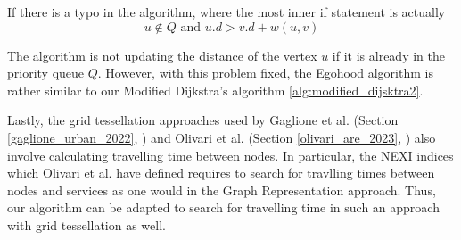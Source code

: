 If there is a typo in the algorithm, where the most inner if statement is actually $$u\notin Q \text{ and }u.d>v.d+w(u,v)$$

The algorithm is not updating the distance of the vertex $u$ if it is already in the priority queue $Q$. However, with this problem fixed, the Egohood algorithm is rather similar to our Modified Dijkstra's algorithm \ref{alg:modified_dijsktra2}.

Lastly, the grid tessellation approaches used by Gaglione et al. (Section \ref{gaglione_urban_2022}, \cite{gaglione_urban_2022}) and Olivari et al. (Section \ref{olivari_are_2023}, \cite{olivari_are_2023}) also involve calculating travelling time between nodes. In particular, the NEXI indices which Olivari et al. have defined requires to search for travlling times between nodes and services as one would in the Graph Representation approach. Thus, our algorithm can be adapted to search for travelling time in such an approach with grid tessellation as well.